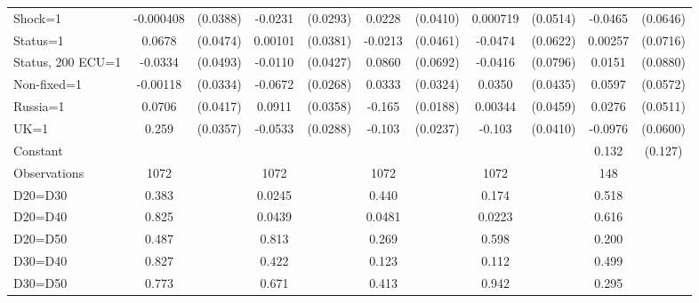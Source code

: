 \begin{tabular}{l|cccccccc|cc}
Shock=1         &-0.000408         & (0.0388)&  -0.0231         & (0.0293)&   0.0228         & (0.0410)& 0.000719         & (0.0514)&  -0.0465         & (0.0646)\\
Status=1        &   0.0678         & (0.0474)&  0.00101         & (0.0381)&  -0.0213         & (0.0461)&  -0.0474         & (0.0622)&  0.00257         & (0.0716)\\
Status, 200 ECU=1&  -0.0334         & (0.0493)&  -0.0110         & (0.0427)&   0.0860         & (0.0692)&  -0.0416         & (0.0796)&   0.0151         & (0.0880)\\
Non-fixed=1     & -0.00118         & (0.0334)&  -0.0672\sym{**} & (0.0268)&   0.0333         & (0.0324)&   0.0350         & (0.0435)&   0.0597         & (0.0572)\\
Russia=1        &   0.0706\sym{*}  & (0.0417)&   0.0911\sym{**} & (0.0358)&   -0.165\sym{***}& (0.0188)&  0.00344         & (0.0459)&   0.0276         & (0.0511)\\
UK=1            &    0.259\sym{***}& (0.0357)&  -0.0533\sym{*}  & (0.0288)&   -0.103\sym{***}& (0.0237)&   -0.103\sym{**} & (0.0410)&  -0.0976         & (0.0600)\\
Constant        &                  &         &                  &         &                  &         &                  &         &    0.132         &  (0.127)\\
\hline
Observations    &     1072         &         &     1072         &         &     1072         &         &     1072         &         &      148         &         \\
D20=D30         &    0.383         &         &   0.0245         &         &    0.440         &         &    0.174         &         &    0.518         &         \\
D20=D40         &    0.825         &         &   0.0439         &         &   0.0481         &         &   0.0223         &         &    0.616         &         \\
D20=D50         &    0.487         &         &    0.813         &         &    0.269         &         &    0.598         &         &    0.200         &         \\
D30=D40         &    0.827         &         &    0.422         &         &    0.123         &         &    0.112         &         &    0.499         &         \\
D30=D50         &    0.773         &         &    0.671         &         &    0.413         &         &    0.942         &         &    0.295         &         \\

\end{tabular}
